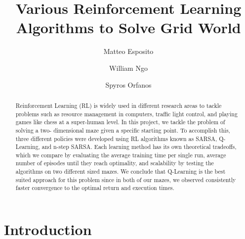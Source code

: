 \documentclass[final,12pt,3p]{elsarticle}
\begin{document}
\begin{frontmatter}
    \title{Various Reinforcement Learning Algorithms to Solve Grid World}

    \author[label1]{Matteo Esposito}
    \author[label1]{William Ngo}
    \author[label1]{Spyros Orfanos}
    \address[label1]{Concordia University, Montreal, Quebec}

    \begin{abstract}
        Reinforcement Learning (RL) is widely used in different research areas to tackle problems such as resource management in computers\cite{tds}, traffic light control\cite{tds}, and playing games like chess\cite{deepmind} at a super-human level. In this project, we tackle the problem of solving a two- dimensional maze given a specific starting point. To accomplish this, three different policies were developed using RL algorithms known as SARSA, Q-Learning, and n-step SARSA.  Each learning method has its own theoretical tradeoffs, which we compare by evaluating the average training time per single run, average number of episodes until they reach optimality, and scalability by testing the algorithms on two different sized mazes. We conclude that Q-Learning is the best suited approach for this problem since in both of our mazes, we observed consistently faster convergence to the optimal return and execution times.
    \end{abstract}
    
\end{frontmatter}

\section{Introduction}
\end{document}
